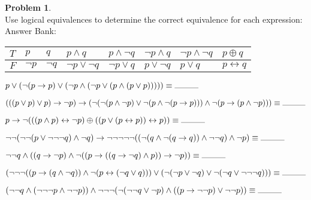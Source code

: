 \documentclass{article}
\theoremstyle{definition}
\newtheorem{problem}{Problem}
\begin{document}
\begin{problem}\ \\
Use logical equivalences to determine the correct equivalence for each expression:\\
Answer Bank:\\
\begin{tabular}{|l|l|l|l|l|l|l|l|}
\hline
$T$ & $p$         & $q$         & $p \wedge q$             & $p \wedge \neg q$ & $\neg p \wedge q$ & $\neg p \wedge \neg q$ & $p \oplus q$\\
\hline
$F$ & $\neg p$ & $\neg q$ & $\neg p \vee \neg q$ & $\neg p \vee q$     & $p \vee \neg q$      & $p \vee q$                      & $p \leftrightarrow q$\\
\hline
\end{tabular}
\begin{compactenum}
\item $p \vee (\neg (p \to p) \vee (\neg p \wedge (\neg p \vee (p \wedge (p \vee p))))) \equiv \rule{1cm}{0.01cm}$
\item $(((p \vee p) \vee p) \to \neg p) \to (\neg (\neg (p \wedge \neg p) \vee \neg (p \wedge \neg (p \to p))) \wedge \neg (p \to (p \wedge \neg p))) \equiv \rule{1cm}{0.01cm}$
\item $p \to \neg (((p \wedge p) \leftrightarrow \neg p) \oplus ((p \vee (p \leftrightarrow p)) \leftrightarrow p)) \equiv \rule{1cm}{0.01cm}$
\item $\neg \neg (\neg \neg (p \vee \neg \neg \neg q) \wedge \neg q) \to \neg \neg \neg \neg \neg ((\neg (q \wedge \neg (q \to q)) \wedge \neg \neg q) \wedge \neg p) \equiv \rule{1cm}{0.01cm}$
\item $\neg \neg q \wedge ((q \to \neg p) \wedge \neg ((p \to ((q \to \neg q) \wedge p)) \to \neg p)) \equiv \rule{1cm}{0.01cm}$
\item $(\neg\neg\neg((p \to ( q \wedge \neg q)) \wedge \neg ( p \leftrightarrow (\neg q \vee q))) \vee ( \neg ( \neg p \vee \neg q) \vee \neg ( \neg q \vee \neg \neg \neg q))) \equiv \rule{1cm}{0.01cm}$
\item $(\neg \neg q \wedge (\neg \neg \neg p \wedge \neg \neg p)) \wedge \neg \neg \neg (\neg (\neg \neg q \vee \neg p) \wedge ((p \to \neg \neg p) \vee \neg \neg p)) \equiv \rule{1cm}{0.01cm}$
\end{compactenum}
\end{problem}
\end{document}
